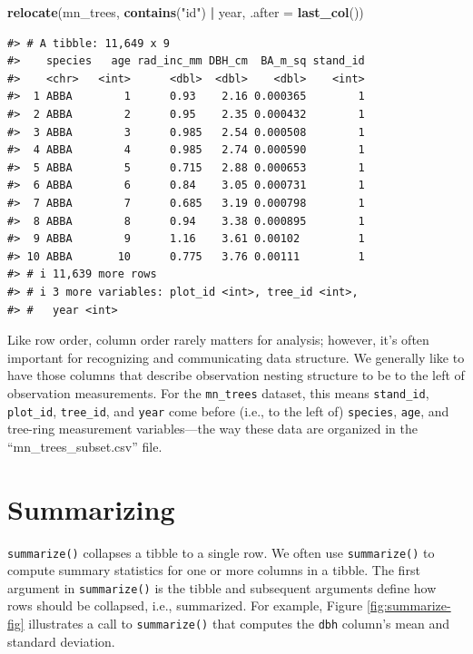 \documentclass[
  11pt,
]{krantz}
\newenvironment{Shaded}{\begin{snugshade}}{\end{snugshade}}
\newcommand{\DataTypeTok}[1]{\textcolor[rgb]{0.13,0.29,0.53}{#1}}
\newcommand{\KeywordTok}[1]{\textcolor[rgb]{0.13,0.29,0.53}{\textbf{#1}}}
\newcommand{\NormalTok}[1]{#1}
\newcommand{\OperatorTok}[1]{\textcolor[rgb]{0.81,0.36,0.00}{\textbf{#1}}}
\newcommand{\StringTok}[1]{\textcolor[rgb]{0.31,0.60,0.02}{#1}}
\theoremstyle{definition}
\theoremstyle{definition}
\theoremstyle{definition}
\theoremstyle{definition}
\theoremstyle{remark}
\begin{document}
\begin{Shaded}
\begin{Highlighting}[]
\KeywordTok{relocate}\NormalTok{(mn\_trees, }\KeywordTok{contains}\NormalTok{(}\StringTok{"id"}\NormalTok{) }\OperatorTok{|}\StringTok{ }\NormalTok{year, }\DataTypeTok{.after =} \KeywordTok{last\_col}\NormalTok{())}
\end{Highlighting}
\end{Shaded}

\begin{verbatim}
#> # A tibble: 11,649 x 9
#>    species   age rad_inc_mm DBH_cm  BA_m_sq stand_id
#>    <chr>   <int>      <dbl>  <dbl>    <dbl>    <int>
#>  1 ABBA        1      0.93    2.16 0.000365        1
#>  2 ABBA        2      0.95    2.35 0.000432        1
#>  3 ABBA        3      0.985   2.54 0.000508        1
#>  4 ABBA        4      0.985   2.74 0.000590        1
#>  5 ABBA        5      0.715   2.88 0.000653        1
#>  6 ABBA        6      0.84    3.05 0.000731        1
#>  7 ABBA        7      0.685   3.19 0.000798        1
#>  8 ABBA        8      0.94    3.38 0.000895        1
#>  9 ABBA        9      1.16    3.61 0.00102         1
#> 10 ABBA       10      0.775   3.76 0.00111         1
#> # i 11,639 more rows
#> # i 3 more variables: plot_id <int>, tree_id <int>,
#> #   year <int>
\end{verbatim}

Like row order, column order rarely matters for analysis; however, it's often important for recognizing and communicating data structure. We generally like to have those columns that describe observation nesting structure to be to the left of observation measurements. For the \texttt{mn\_trees} dataset, this means \texttt{stand\_id}, \texttt{plot\_id}, \texttt{tree\_id}, and \texttt{year} come before (i.e., to the left of) \texttt{species}, \texttt{age}, and tree-ring measurement variables---the way these data are organized in the ``mn\_trees\_subset.csv'' file.

\hypertarget{summarize}{%
\section{Summarizing}\label{summarize}}

\texttt{summarize()} collapses a tibble to a single row. We often use \texttt{summarize()} to compute summary statistics for one or more columns in a tibble. The first argument in \texttt{summarize()} is the tibble and subsequent arguments define how rows should be collapsed, i.e., summarized. For example, Figure \ref{fig:summarize-fig} illustrates a call to \texttt{summarize()} that computes the \texttt{dbh} column's mean and standard deviation.
\end{document}
